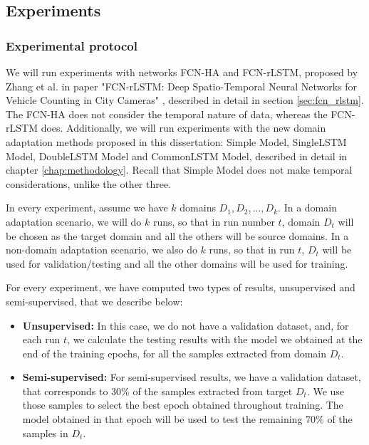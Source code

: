 \subsection{Experiments}

\subsubsection{Experimental protocol}

We will run experiments with networks FCN-HA and FCN-rLSTM, proposed by Zhang et al. in paper "FCN-rLSTM: Deep Spatio-Temporal Neural Networks for
Vehicle Counting in City Cameras" \cite{zhang2017fcnrlstm}, described in detail in section \ref{sec:fcn_rlstm}. The FCN-HA does not consider the temporal nature of data, whereas the FCN-rLSTM does. Additionally, we will run experiments with the new domain adaptation methods proposed in this dissertation: Simple Model, SingleLSTM Model, DoubleLSTM Model and CommonLSTM Model, described in detail in chapter \ref{chap:methodology}. Recall that Simple Model does not make temporal considerations, unlike the other three.

In every experiment, assume we have $k$ domains $D_1, D_2,...,D_k$. In a domain adaptation scenario, we will do $k$ runs, so that in run number $t$, domain $D_t$ will be chosen as the target domain and all the others will be source domains. In a non-domain adaptation scenario, we also do $k$ runs, so that in run $t$, $D_t$ will be used for validation/testing and all the other domains will be used for training.

For every experiment, we have computed two types of results, unsupervised and semi-supervised, that we describe below: 

\begin{itemize}
	\item \textbf{Unsupervised:} In this case, we do not have a validation dataset, and, for each run $t$, we calculate the testing results with the model we obtained at the end of the training epochs, for all the samples extracted from domain $D_t$.
	\item \textbf{Semi-supervised:} For semi-supervised results, we have a validation dataset, that corresponds to $30\%$ of the samples extracted from target $D_t$. We use those samples to select the best epoch obtained throughout training. The model obtained in that epoch will be used to test the remaining $70\%$ of the samples in $D_t$.
\end{itemize}

